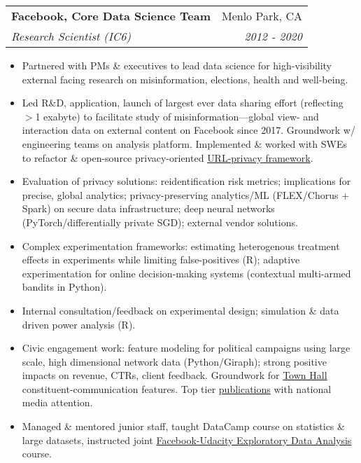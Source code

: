 \documentclass[letterpaper,11pt]{article}
\makeatletter
\newcommand{\resitem}[1]{\item #1 \vspace{-6pt}}
\newcommand{\ressubheading}[4]{\vspace{2pt}
\begin{tabular*}{7.58in}{l@{\extracolsep{\fill}}r}
		\textbf{#1} & #2 \\
		\textit{#3} & \textit{#4} \\
\end{tabular*}\vspace{-1pt}}
\makeatother
\begin{document}
\ressubheading{Facebook, Core Data Science Team}{Menlo Park, CA}{Research Scientist (IC6)}{2012 - 2020}
	\begin{itemize}
       	 	\resitem{Partnered with PMs \& executives to lead data science for high-visibility external facing research on misinformation, elections, health and well-being.} 
		\resitem{Led R\&D, application, launch of largest ever data sharing effort (reflecting $>$1 exabyte) to facilitate study of misinformation---global view- and interaction data on external content on Facebook since 2017. Groundwork w/ engineering teams on analysis platform. Implemented \& worked with SWEs to refactor \& open-source privacy-oriented \href{https://github.com/facebookresearch/URL-Sanitization}{URL-privacy framework}.}
		\resitem{Evaluation of privacy solutions: reidentification risk metrics; implications for precise, global analytics; privacy-preserving analytics/ML (FLEX/Chorus + Spark) on secure data infrastructure; deep neural networks (PyTorch/differentially private SGD); external vendor solutions.}
		\resitem{Complex experimentation frameworks: estimating heterogenous treatment effects in experiments while limiting false-positives (R); adaptive experimentation for online decision-making systems (contextual multi-armed bandits in Python).}
		\resitem{Internal consultation/feedback on experimental design; simulation \& data driven power analysis (R).}
		\resitem{Civic engagement work: feature modeling for political campaigns using large scale, high dimensional network data (Python/Giraph); strong positive impacts on revenue, CTRs, client feedback. Groundwork for \href{https://www.facebook.com/townhall/}{Town Hall} constituent-communication features. Top tier \href{https://dl.dropboxusercontent.com/u/25710348/Science-2015-Bakshy-1130-2.pdf}{publications} with national media attention. }
		\resitem{Managed \& mentored junior staff, taught DataCamp course on statistics \& large datasets, instructed joint \href{https://www.udacity.com/course/data-analysis-with-r--ud651}{Facebook-Udacity Exploratory Data Analysis} course.}
	\end{itemize}
\end{document}
